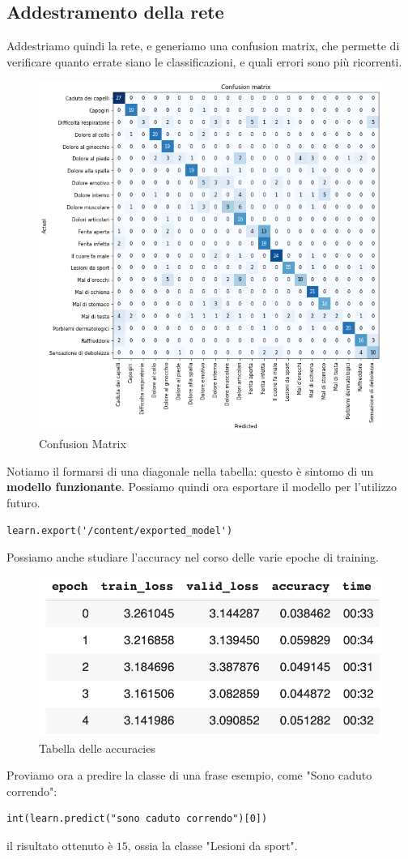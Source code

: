 \subsection{Addestramento della rete}
Addestriamo quindi la rete, e generiamo una confusion matrix, che permette di verificare quanto errate siano le classificazioni, e quali errori sono più ricorrenti.
\begin{figure}[H]
    \begin{center}
        \includegraphics[width=0.8\columnwidth]{images/fallback/ConfusionMatrix.png}
    \end{center}
    \caption{Confusion Matrix}
    \label{fig:confusion-matrix}
\end{figure}
Notiamo il formarsi di una diagonale nella tabella: questo è sintomo di un \textbf{modello funzionante}. Possiamo quindi ora esportare il modello per l'utilizzo futuro.
\begin{verbatim}
learn.export('/content/exported_model')
\end{verbatim}
Possiamo anche studiare l'accuracy nel corso delle varie epoche di training.
\begin{figure}[H]
    \begin{center}
        \includegraphics[width=0.5\columnwidth]{images/fallback/Accuracy.png}
    \end{center}
    \caption{Tabella delle accuracies}
    \label{fig:accuracy-table}
\end{figure}
Proviamo ora a predire la classe di una frase esempio, come "Sono caduto correndo":
\begin{verbatim}
int(learn.predict("sono caduto correndo")[0])
\end{verbatim}
il risultato ottenuto è $15$, ossia la classe "Lesioni da sport".
